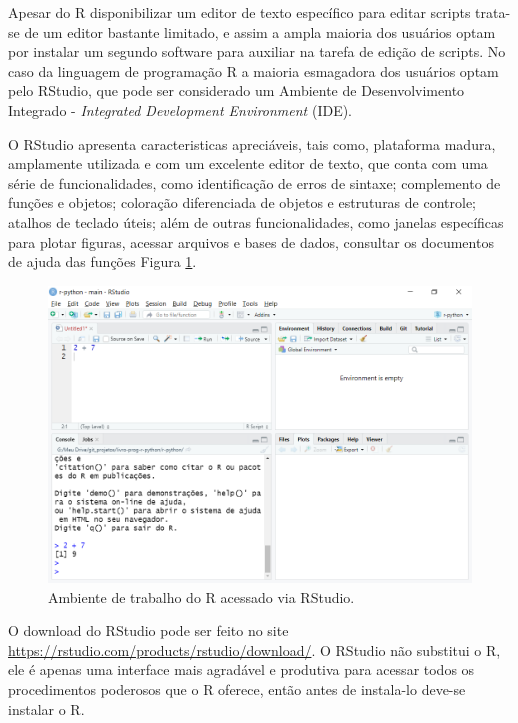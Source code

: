 \documentclass[
  11pt,
  a5paper,
  openany]{book}
\begin{document}
Apesar do R disponibilizar um editor de texto específico para editar scripts trata-se de um editor bastante limitado, e assim a ampla maioria dos usuários optam por instalar um segundo software para auxiliar na tarefa de edição de scripts. No caso da linguagem de programação R a maioria esmagadora dos usuários optam pelo RStudio, que pode ser considerado um Ambiente de Desenvolvimento Integrado - \emph{Integrated Development Environment} (IDE).

O RStudio apresenta caracteristicas apreciáveis, tais como, plataforma madura, amplamente utilizada e com um excelente editor de texto, que conta com uma série de funcionalidades, como identificação de erros de sintaxe; complemento de funções e objetos; coloração diferenciada de objetos e estruturas de controle; atalhos de teclado úteis; além de outras funcionalidades, como janelas específicas para plotar figuras, acessar arquivos e bases de dados, consultar os documentos de ajuda das funções Figura \ref{fig:FigRrstudio}.

\begin{figure}

{\centering \includegraphics[width=1\linewidth]{images/Fig_R_rstudio} 

}

\caption{Ambiente de trabalho do R acessado via RStudio.}\label{fig:FigRrstudio}
\end{figure}

O download do RStudio pode ser feito no site \url{https://rstudio.com/products/rstudio/download/}. O RStudio não substitui o R, ele é apenas uma interface mais agradável e produtiva para acessar todos os procedimentos poderosos que o R oferece, então antes de instala-lo deve-se instalar o R.
\end{document}
